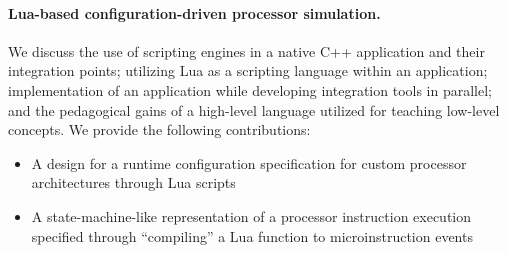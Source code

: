 \paragraph{Lua-based configuration-driven processor simulation.} We discuss the use of scripting engines in a native C++ application and their integration points; utilizing Lua as a scripting language within an application; implementation of an application while developing integration tools in parallel; and the pedagogical gains of a high-level language utilized for teaching low-level concepts. We provide the following contributions:
\begin{itemize}
    \item A design for a runtime configuration specification for custom processor architectures through Lua scripts
    \item A state-machine-like representation of a processor instruction execution specified through ``compiling'' a Lua function to microinstruction events
\end{itemize}
%
%
%
